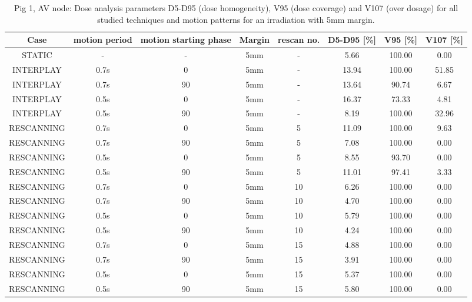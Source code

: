 \documentclass[type=dr, dr=rernat, accentcolor=tud7b,colorbacktitle, bigchapter, openright, twoside, 12pt ]{tudthesis}
\begin{document}
\begin{table}[H]
  \centering
  \tiny
  \caption{Pig 1, AV node: Dose analysis parameters D5-D95 (dose homogeneity), V95 (dose coverage) and V107 (over dosage) for all studied 
  techniques and motion patterns for an irradiation with 5mm margin.}
  \begin{tabular}{|c||c|c|c|c||c|c|c|}
    \hline\hline
    Case & motion period & motion starting phase & Margin & rescan no. & D5-D95 [\%] & V95 [\%] & V107 [\%] \\
    \hline \hline
STATIC & - & - & 5mm & - & 5.66 & 100.00 & 0.00\\
\hline \hline
INTERPLAY & 0.7s & 0 & 5mm & - & 13.94 & 100.00 & 51.85\\
INTERPLAY & 0.7s & 90 & 5mm & - & 13.64 & 90.74 & 6.67\\
INTERPLAY & 0.5s & 0 & 5mm & - & 16.37 & 73.33 & 4.81\\
INTERPLAY & 0.5s & 90 & 5mm & - & 8.19 & 100.00 & 32.96\\
\hline \hline
RESCANNING & 0.7s & 0 & 5mm & 5 & 11.09 & 100.00 & 9.63\\
RESCANNING & 0.7s & 90 & 5mm & 5 & 7.08 & 100.00 & 0.00\\
RESCANNING & 0.5s & 0 & 5mm & 5 & 8.55 & 93.70 & 0.00\\
RESCANNING & 0.5s & 90 & 5mm & 5 & 11.01 & 97.41 & 3.33\\
\hline
RESCANNING & 0.7s & 0 & 5mm & 10 & 6.26 & 100.00 & 0.00\\
RESCANNING & 0.7s & 90 & 5mm & 10 & 4.70 & 100.00 & 0.00\\
RESCANNING & 0.5s & 0 & 5mm & 10 & 5.79 & 100.00 & 0.00\\
RESCANNING & 0.5s & 90 & 5mm & 10 & 4.24 & 100.00 & 0.00\\
\hline
RESCANNING & 0.7s & 0 & 5mm & 15 & 4.88 & 100.00 & 0.00\\
RESCANNING & 0.7s & 90 & 5mm & 15 & 3.91 & 100.00 & 0.00\\
RESCANNING & 0.5s & 0 & 5mm & 15 & 5.37 & 100.00 & 0.00\\
RESCANNING & 0.5s & 90 & 5mm & 15 & 5.80 & 100.00 & 0.00\\
    \hline\hline 
  \end{tabular}
  \label{tab:Pig1_AV}
\end{table}

\vspace*{-0.6cm}
\end{document}
